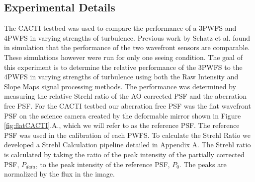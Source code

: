 \documentclass[12pt]{spieman}  %
\begin{document}
\begin{spacing}{2}
				


\section{Experimental Details}


The CACTI testbed was used to compare the performance of a 3PWFS and 4PWFS in varying strengths of turbulence. Previous work by Schatz et al. found in simulation that the performance of the two wavefront sensors are comparable. These simulations however were run for only one seeing condition. The goal of this experiment is to determine the relative performance of the 3PWFS to the 4PWFS in varying strengths of turbulence using both the Raw Intensity and Slope Maps signal processing methods. The performance was determined by measuring the relative Strehl ratio of the AO corrected PSF and the aberration free PSF. For the CACTI testbed our aberration free PSF was the flat wavefront PSF on the science camera created by the deformable mirror shown in Figure \ref{fig:flatCACTI}.A., which we will refer to as the reference PSF. The reference PSF was used in the calibration of each PWFS. To calculate the Strehl Ratio we developed a Strehl Calculation pipeline detailed in Appendix A. The Strehl ratio is calculated by taking the ratio of the peak intensity of the partially corrected PSF, $P_{data}$,  to the peak intensity of the reference PSF, $P_0$. The peaks are normalized by the flux in the image. 


\end{spacing}
\end{document}
